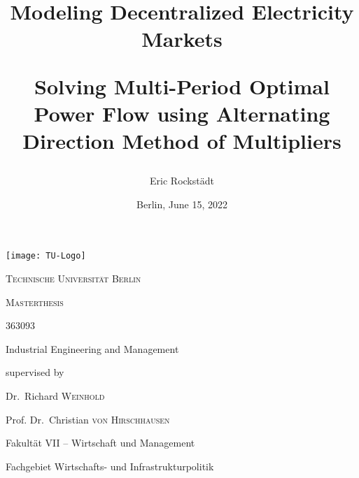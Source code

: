 \documentclass[12pt, a4paper, oneside, bibliography=totoc, numbers=noendperiod]{scrartcl}
\title{\Huge\textbf{Modeling Decentralized Electricity Markets}\par\vspace{0.5cm} \Large Solving Multi-Period Optimal Power Flow using Alternating Direction Method of Multipliers}
\author{Eric Rockstädt}
\date{Berlin, June 15, 2022}
\begin{document}
\begin{titlepage}
	\centering
	\texttt{[image: TU-Logo]}\par\vspace{1cm}
	{\scshape\Large Technische Universität Berlin \par}
	\vspace{1cm}
	{\scshape\Huge Masterthesis\par}
	\vspace{1cm}
	{\@title \par}
	\vspace{1cm}
	{\Large \textit{\@author} \par \large 363093 \par Industrial Engineering and Management \par}
	\vspace{1.5cm}
	\large
	supervised by\par
	Dr.~Richard \textsc{Weinhold}\par
	Prof. Dr.~Christian \textsc{von Hirschhausen} \par
	\vspace{0.5cm}
	Fakultät VII – Wirtschaft und Management \par
	Fachgebiet
Wirtschafts- und Infrastrukturpolitik \par
	\vfill
	{\large \@date\par}
\end{titlepage}

\newpage



\newpage


\newpage

\tableofcontents
\newpage

\chead{\textit{\listfigurename}} 
\listoffigures
\newpage

\chead{\textit{\listtablename}} 
\listoftables
\newpage

\chead{\textit{\lstlistlistingname}} 
\lstlistoflistings
\newpage


\printnomenclature
\newpage


\printglossary[type=\acronymtype, title=Abbreviations]
\newpage



\newpage


\newpage


\newpage


\newpage


\newpage

\printbibliography
\newpage


\end{document}
